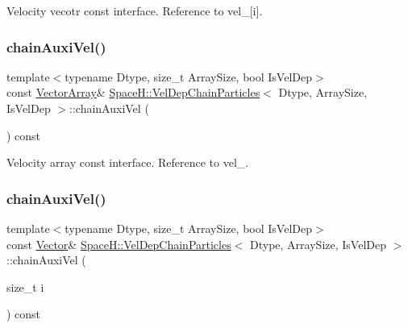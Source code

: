 Velocity vecotr const interface. Reference to vel\+\_\+\mbox{[}i\mbox{]}. 

\mbox{\label{class_space_h_1_1_vel_dep_chain_particles_ab2ec7493ee6cb12ed77f6aac4f4e8660}} 
\subsubsection{\texorpdfstring{chain\+Auxi\+Vel()}{chainAuxiVel()}\hspace{0.1cm}{\footnotesize\ttfamily [3/4]}}
{\footnotesize\ttfamily template$<$typename Dtype, size\+\_\+t Array\+Size, bool Is\+Vel\+Dep$>$ \\
const \mbox{\hyperlink{class_space_h_1_1_vel_indep_particles_aa9983058940249df8b00fa800e8cbad2}{Vector\+Array}}\& \mbox{\hyperlink{class_space_h_1_1_vel_dep_chain_particles}{Space\+H\+::\+Vel\+Dep\+Chain\+Particles}}$<$ Dtype, Array\+Size, Is\+Vel\+Dep $>$\+::chain\+Auxi\+Vel (\begin{DoxyParamCaption}{ }\end{DoxyParamCaption}) const\hspace{0.3cm}{\ttfamily [inline]}}



Velocity array const interface. Reference to vel\+\_\+. 

\mbox{\label{class_space_h_1_1_vel_dep_chain_particles_a1f717dd8619e3237362bacd55623500c}} 
\subsubsection{\texorpdfstring{chain\+Auxi\+Vel()}{chainAuxiVel()}\hspace{0.1cm}{\footnotesize\ttfamily [4/4]}}
{\footnotesize\ttfamily template$<$typename Dtype, size\+\_\+t Array\+Size, bool Is\+Vel\+Dep$>$ \\
const \mbox{\hyperlink{class_space_h_1_1_vel_indep_particles_a61bbcfdb0dc7f99f3c68af69a755c935}{Vector}}\& \mbox{\hyperlink{class_space_h_1_1_vel_dep_chain_particles}{Space\+H\+::\+Vel\+Dep\+Chain\+Particles}}$<$ Dtype, Array\+Size, Is\+Vel\+Dep $>$\+::chain\+Auxi\+Vel (\begin{DoxyParamCaption}\item[{size\+\_\+t}]{i }\end{DoxyParamCaption}) const\hspace{0.3cm}{\ttfamily [inline]}}



